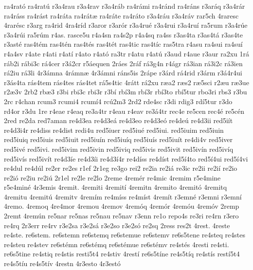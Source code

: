{ra4rat^^f3
ra4rat^^fa
r3a4rau
r3a4rav
r3a4r^^e1b
ra4r^^e1mi
ra4r^^e1nd
ra4r^^e1ns
r3ar^^e1q
r3a4r^^e1r
ra4r^^e1ss
ra4r^^e1st
ra4r^^e1ta
ra4r^^e1t^^e6
ra4r^^e1te
ra4r^^e1to
r3a4r^^e1u
r3a4r^^e1v
rar5ch
4raresc
4rar^^e9sc
r3arg
ra4rid
4ra4r^^edd
r3aror
r3ar^^f3r
r3a4ru^^e9
r3a4rui
r3a4ru^^ed
ra5rum
r3a4r^^fae
r3a4r^^fai
ra5r^^fam
r4as.
rasce5u
r4a4sn
ra4s2p
r4a4sq
ra4ss
r3as4ta
r3as4t^^e1
r3as4te
r3ast^^e9
ras4t^^e9m
ras4t^^e9n
ras4t^^e9s
ras4t^^e9t
ras4tic
ras4t^^edc
ras5tra
r4asu
ra4sui
ra4su^^ed
r4a4sv
r4ate
r4ati
r4at^^ed
r4ato
r4at^^f3
ra3tr
r4atu
r4at^^fa
r3aud
r4aue
r3aur
ra2xu
1r^^e1
r^^e1b2i
r^^e1bi3c
r^^e14cer
r3^^e12cr
r5^^e1equen
2r^^e1es
2r^^e1f
r^^e13g4n
r4^^e1gr
r^^e13ian
r^^e13i2c
r^^e13ien
r^^e12iu
r^^e13li
4r3^^e1mna
4r^^e1mn^^e6
4r3^^e1mni
r^^e1ns5is
2r^^e1pe
r3^^e1rd
r^^e14rid
r3^^e1rm
r3^^e14r4ui
r3^^e1s4ta
r^^e1s4tem
r^^e1s4tes
r^^e1s4tet
r^^e15s4tic
4r^^e1tt
r^^e12xu
r^^e6a2
r^^e6s2
r^^e65sci
r2^^e6u
r^^e63ue
r2^^e63v
2rb2
rb^^e63
r3bi
rbi3c
rbi3r
r3b^^ed
rb^^ed3m
rb^^ed3r
rb^^ed3to
rb^^ed5tur
rbo3ri
rbs3
r3bu
2rc
r4chan
rcum3
rcumi4
rcum^^ed4
rc^^fa2m3
2rd2
rde4sc
r3di
rdig3
rd^^ed5tur
r3do
rd4or
r3du
1re
r4eae
r4eaq
re3a4tr
r4eau
r4eav
re3^^e14tr
rec4e
re5cen
rec4^^e9
re5c^^e9n
2red
re2da
red7aman
re4d3ea
re4d3e^^e1
re4d3eo
re4d3e^^f3
re4de^^fa
re4d3ii
red5i^^edt
re4d3i4r
re4diss
re4dist
redi4u
red5iuer
red5iu^^e9
red5iui.
red5iuim
red5iuin
red5iuiq
red5iuis
red5iuit
red5iu^^edn
red5iu^^edq
red5iu^^eds
red5iu^^edt
re4di4v
red5iver
red5iv^^e9
red5ivi.
red5ivim
red5ivin
red5iviq
red5ivis
red5ivit
red5iv^^edn
red5iv^^edq
red5iv^^eds
red5iv^^edt
re4d3^^ede
re4d3^^edi
re4d3^^ed4r
re4d^^edss
re4d^^edst
red5^^ed4to
red5^^ed4ui
red5^^ed4vi
re4dul
re4d^^fal
re2er
re2es
r1ef
2r1eg
re3go
rei2
re2ia
re2i^^e1
re3ic
re2ii
re2i^^ed
re2io
re2i^^f3
re2iu
re2i^^fa
2r1el
re2le
re2lo
2reme
4rem^^e9r
re4mic
4remim
r5e4mine
r5e4min^^e9
4r3emis
4remit.
4remiti
4remit^^ed
4remitn
4remito
4remit^^f3
4remitq
4remitu
4remit^^fa
4remitv
4rem^^edm
re4m^^edss
re4m^^edst
4rem^^edt
r3emn^^e9
r3emni
r3emn^^ed
4remo.
4remoq
4re4mor
4remou
4remov
4rem^^f3q
4rem^^f3r
4rem^^f3u
4rem^^f3v
2remp
2remt
4rem^^fan
re5nar
re5nas
re5nau
re5nav
r3enn
re1o
repo4s
re3ri
re4rn
r3ero
re4rq
2r3err
re4rv
r3e2sa
r3e2s^^e1
r3e2so
r3e2s^^f3
re2sq
2ress
res2t
4rest.
4reste
re4ste.
re6stem.
re6stemn
re6stemq
re6stemue
re6stemv
re6s5tene
re4steq
re4stes
re4steu
re4stev
re6st^^e9mn
re6st^^e9mq
re6st^^e9mue
re6st^^e9mv
re4st^^e9s
4resti
re4sti.
re6s5tine
re4stiq
re4stis
resti5t4
re4stiv
4rest^^ed
re6s5t^^edne
re4s5t^^edq
re4st^^eds
rest^^ed5t4
re4s5t^^edu
re4s5t^^edv
4restn
4r3esto
4r3est^^f3
}
